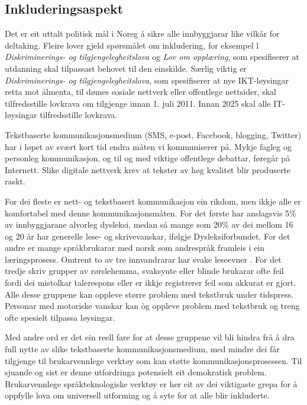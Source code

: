 \begin{multicols}{2}
\subsection{Inkluderingsaspekt} 

Det er eit uttalt politisk mål i Noreg å sikre alle innbyggjarar like vilkår for deltaking. 
Fleire lover gjeld spørsmålet om inkludering, for eksempel l \textit{Diskriminerings- og tilgjengelegheitslova} og \textit{Lov om opplæring}, som spesifiserer at utdanning skal tilpassast behovet til den einskilde. Særlig viktig er \textit{Diskriminerings- og tilgjengelegheitslova}, som spesifiserer at nye IKT-løysingar retta mot ålmenta, til dømes sosiale nettverk eller offentlege nettsider, skal tilfredsstille lovkrava om tilgjenge innan 1. juli 2011. 
Innan 2025 skal alle IT-løysingar tilfredsstille lovkrava. 

Tekstbaserte kommunikasjonsmedium (SMS, e-post, Facebook, blogging, Twitter) har i løpet av svært kort tid endra måten vi kommuniserer på. 
Mykje fagleg og personleg kommunikasjon, og til og med viktige offentlege debattar, føregår på Internett. Slike digitale nettverk krev at tekster av høg kvalitet blir produserte raskt. 

For dei fleste er nett- og tekstbasert kommunikasjon ein rikdom, men ikkje alle er komfortabel med denne kommunikasjonsmåten. 
For det første har anslagsvis 5\% av innbyggjarane alvorleg dysleksi, medan så mange som 20\% av dei mellom 16 og 20 år har generelle lese- og skrivevanskar, ifølgje Dysleksiforbundet. 
For det andre er mange språkbrukarar med norsk som andrespråk framleis i ein læringsprosess. 
Omtrent to av tre innvandrarar har svake leseevner \cite{gabrielsen2007}.
For det tredje skriv grupper av rørslehemma, svaksynte eller blinde brukarar ofte feil fordi dei mistolkar talerespons eller er ikkje registrerer feil som akkurat er gjort. 
Alle desse gruppene kan oppleve større problem med tekstbruk under tidspress. 
Personar med motoriske vanskar kan òg oppleve problem med tekstbruk og treng ofte spesielt tilpassa løysingar.

Med andre ord er det ein reell fare for at desse gruppene vil bli hindra frå å dra full nytte av slike tekstbaserte kommunikasjonsmedium, med mindre dei får tilgjenge til brukarvennlege verktøy som kan støtte kommunikasjonsprosessen. 
Til sjuande og sist er denne utfordringa potensielt eit demokratisk problem. 
Brukarvennlege språkteknologiske verktøy er her eit av dei viktigaste grepa for å oppfylle lova om universell utforming og å syte for at alle blir inkluderte.


\end{multicols}
